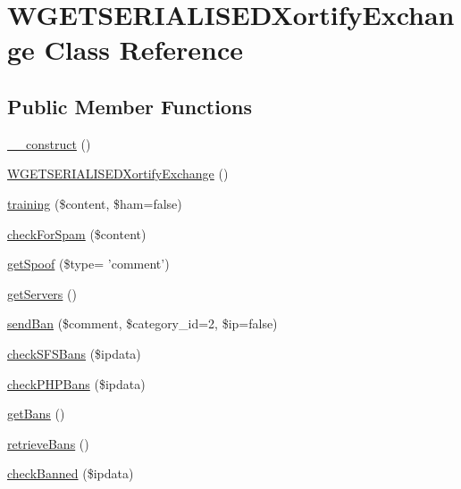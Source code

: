 \hypertarget{class_w_g_e_t_s_e_r_i_a_l_i_s_e_d_xortify_exchange}{\section{W\-G\-E\-T\-S\-E\-R\-I\-A\-L\-I\-S\-E\-D\-Xortify\-Exchange Class Reference}
\label{class_w_g_e_t_s_e_r_i_a_l_i_s_e_d_xortify_exchange}
}
\subsection*{Public Member Functions}
\begin{DoxyCompactItemize}
\item 
\hyperlink{class_w_g_e_t_s_e_r_i_a_l_i_s_e_d_xortify_exchange_a095c5d389db211932136b53f25f39685}{\-\_\-\-\_\-construct} ()
\item 
\hyperlink{class_w_g_e_t_s_e_r_i_a_l_i_s_e_d_xortify_exchange_a01a64763f4983c5d16db5b686c13b52e}{W\-G\-E\-T\-S\-E\-R\-I\-A\-L\-I\-S\-E\-D\-Xortify\-Exchange} ()
\item 
\hyperlink{class_w_g_e_t_s_e_r_i_a_l_i_s_e_d_xortify_exchange_a3b3be735e633ba330c6b5d086aa508cd}{training} (\$content, \$ham=false)
\item 
\hyperlink{class_w_g_e_t_s_e_r_i_a_l_i_s_e_d_xortify_exchange_a7a4f53c3841dc7806455261af557d514}{check\-For\-Spam} (\$content)
\item 
\hyperlink{class_w_g_e_t_s_e_r_i_a_l_i_s_e_d_xortify_exchange_ae7926cba79660f77479306100f492c03}{get\-Spoof} (\$type= 'comment')
\item 
\hyperlink{class_w_g_e_t_s_e_r_i_a_l_i_s_e_d_xortify_exchange_a882f365bc81e207dc2123ef707735e82}{get\-Servers} ()
\item 
\hyperlink{class_w_g_e_t_s_e_r_i_a_l_i_s_e_d_xortify_exchange_a0293acfa4afe0cb5b2816352a35d8ca7}{send\-Ban} (\$comment, \$category\-\_\-id=2, \$ip=false)
\item 
\hyperlink{class_w_g_e_t_s_e_r_i_a_l_i_s_e_d_xortify_exchange_a985a563a84e3e5c54694fcce192bda53}{check\-S\-F\-S\-Bans} (\$ipdata)
\item 
\hyperlink{class_w_g_e_t_s_e_r_i_a_l_i_s_e_d_xortify_exchange_aeb1bf9aaee4718870adbd07333490aaf}{check\-P\-H\-P\-Bans} (\$ipdata)
\item 
\hyperlink{class_w_g_e_t_s_e_r_i_a_l_i_s_e_d_xortify_exchange_aea26db2906896833d32445a698fc4cdc}{get\-Bans} ()
\item 
\hyperlink{class_w_g_e_t_s_e_r_i_a_l_i_s_e_d_xortify_exchange_a4af29af927aae9aada97ef0c2cd08fa1}{retrieve\-Bans} ()
\item 
\hyperlink{class_w_g_e_t_s_e_r_i_a_l_i_s_e_d_xortify_exchange_ae41df0f26620b727f7f63342648f6474}{check\-Banned} (\$ipdata)
\end{DoxyCompactItemize}
